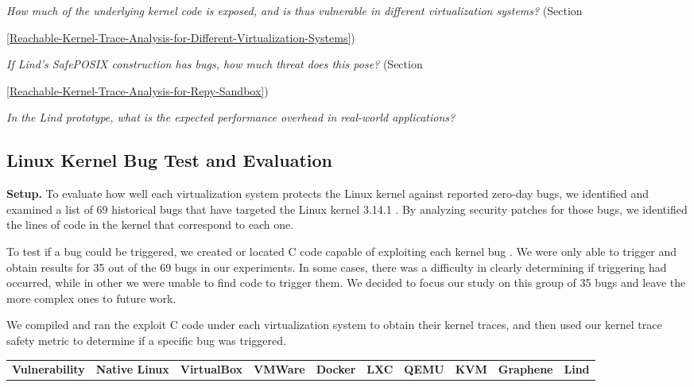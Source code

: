 \textit{How much of the underlying kernel code is exposed, and is thus
vulnerable in different virtualization systems?}
(Section~{{\ref{Reachable-Kernel-Trace-Analysis-for-Different-Virtualization-Systems}})

\textit{If Lind's SafePOSIX construction has bugs, how much threat does this pose?}
(Section~{{\ref{Reachable-Kernel-Trace-Analysis-for-Repy-Sandbox}})

\textit{In the Lind prototype, what is the expected performance overhead in
real-world applications?}


\subsection{Linux Kernel Bug Test and Evaluation}
\label{Linux-Kernel-Bug-Test-and-Evaluation}


\noindent
\textbf{Setup.}
To evaluate how well each virtualization system protects the Linux kernel
against reported zero-day bugs,
we identified and examined a list of 69 historical bugs that have
targeted the Linux kernel 3.14.1 \cite{CVE-Datasource}.
By analyzing security patches for those bugs,
we identified the lines of code in the kernel that correspond to each one.

To test if a bug could be triggered, we created or located C
code capable of exploiting each kernel bug \cite{Exploit-Database}.
We were only able to trigger and obtain results for 35 out of the 69 bugs in our
experiments. In some cases, there was a
difficulty in clearly determining if triggering had occurred, while in other we
were unable to find code to trigger them. We decided to focus our study on
this group of 35 bugs and leave the more complex ones to future work.

We compiled and ran the exploit C code under each virtualization system to
obtain their kernel traces, and then used our kernel trace safety metric to
determine if a specific bug was triggered.

\begin{table*}[!ht]
\scriptsize
\centering

\begin{tabular}{|p{1.7cm}|l|l|p{1cm}|p{1cm}|p{.8cm}|p{1cm}|p{.8cm}|p{1cm}|p{.8cm}|}\hline

\multirow{2}{1.7cm}{\bf Vulnerability}    &  \multirow{2}{.7cm}{\bf Native Linux}  &  \multirow{2}{*}{\bf VirtualBox}
&  \multirow{2}{.7cm}{\bf VMWare}
 & \multirow{2}{1cm}{\bf Docker} & \multirow{2}{1cm}{\bf LXC} &
\multirow{2}{1cm}{\bf QEMU} & \multirow{2}{1cm}{\bf KVM} &
\multirow{2}{1cm}{\bf Graphene} & \multirow{2}{1cm}{\bf Lind} \\
& & & & & & & & & \\
\hline


\end{tabular}
\end{table*}}}
